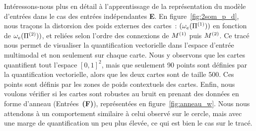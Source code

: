 \documentclass[../main]{subfiles}
\begin{document}
Intéressons-nous plus en détail à l'apprentissage de la représentation du modèle d'entrées dans le cas des entrées indépendantes \textbf{E}.
En figure~\ref{fig:2som_p_d}, nous traçons la distorsion des poids externes des cartes~: $(\omega_e(\Pi^{({1})}))$ en fonction de  $\omega_e(\Pi^{({2})}))$, et reliées selon l'ordre des connexions de $M^{({1})}$ puis $M^{({2})}$.
Ce tracé nous permet de visualiser la quantification vectorielle dans l'espace d'entrée multimodal et non seulement sur chaque carte. Nous y observons que les cartes quantifient tout l'espace $[0,1]^2$, mais que seulement 90 points sont définies par la quantification vectorielle, alors que les deux cartes sont de taille 500. 
Ces points sont définis par les zones de poids contextuels des cartes.
 Enfin, nous voulons vérifier si les cartes sont robustes au bruit en prenant des données en forme d'anneau (Entrées~\textbf{(F)}), représentées en figure~\ref{fig:anneau_w}. Nous nous attendons à un comportement similaire à celui observé sur le cercle, mais avec une marge de quantification un peu plus élevée, ce qui est bien le cas sur le tracé.
\end{document}
